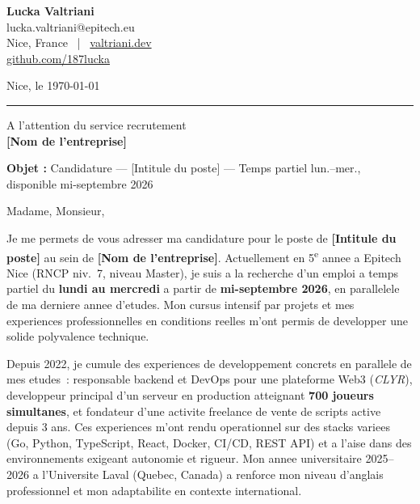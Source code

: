 \documentclass[11pt,a4paper]{article}
\newcommand{\myphone}{}
\newcommand{\entreprise}{[Nom de l'entreprise]}
\newcommand{\poste}{[Intitule du poste]}
\begin{document}
\begin{minipage}[t]{0.55\linewidth}
  {\large\bfseries\color{accent} Lucka Valtriani}\\[2pt]
  {\small\color{gray}
    \myphone{}lucka.valtriani@epitech.eu\\
    Nice, France ~|~ \href{https://valtriani.dev}{valtriani.dev}\\
    \href{https://github.com/187lucka}{github.com/187lucka}
  }
\end{minipage}
\hfill
\begin{minipage}[t]{0.38\linewidth}
  \raggedleft
  {\small\color{gray} Nice, le \today}
\end{minipage}

\vspace{0.5pt}
{\color{accent}\rule{\linewidth}{0.6pt}}
\vspace{14pt}

{\small\color{gray}
  A l'attention du service recrutement\\
  \textbf{\entreprise}
}

\vspace{14pt}

\noindent\textbf{Objet :} Candidature --- \poste{} --- Temps partiel lun.--mer., disponible mi-septembre 2026

\vspace{18pt}

Madame, Monsieur,

\vspace{4pt}

Je me permets de vous adresser ma candidature pour le poste de \textbf{\poste} au sein de \textbf{\entreprise}. Actuellement en 5\textsuperscript{e} annee a Epitech Nice (RNCP niv.~7, niveau Master), je suis a la recherche d'un emploi a temps partiel du \textbf{lundi au mercredi} a partir de \textbf{mi-septembre 2026}, en parallelele de ma derniere annee d'etudes. Mon cursus intensif par projets et mes experiences professionnelles en conditions reelles m'ont permis de developper une solide polyvalence technique.

Depuis 2022, je cumule des experiences de developpement concrets en parallele de mes etudes~: responsable backend et DevOps pour une plateforme Web3 (\textit{CLYR}), developpeur principal d'un serveur en production atteignant \textbf{700 joueurs simultanes}, et fondateur d'une activite freelance de vente de scripts active depuis 3 ans. Ces experiences m'ont rendu operationnel sur des stacks variees (Go, Python, TypeScript, React, Docker, CI/CD, REST API) et a l'aise dans des environnements exigeant autonomie et rigueur. Mon annee universitaire 2025--2026 a l'Universite Laval (Quebec, Canada) a renforce mon niveau d'anglais professionnel et mon adaptabilite en contexte international.
\end{document}
